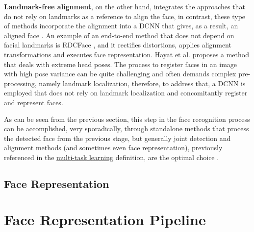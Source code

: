 \documentclass[class=report, crop=false, a4paper, 12pt]{standalone}
\begin{document}
\vspace{\baselineskip}
\par \noindent \textbf{Landmark-free alignment}, on the other hand, integrates the approaches that do not rely on landmarks as a reference to align the face, in contrast, these type of methods incorporate the alignment into a DCNN that gives, as a result, an aligned face \autocite{duElementsEndtoendDeep2022}. An example of an end-to-end method that does not depend on facial landmarks is RDCFace \autocite{zhaoRDCFaceRadialDistortion2020}, and it rectifies distortions, applies alignment transformations and executes face representation. Hayat et al. \autocite{hayatJointRegistrationRepresentation2017} proposes a method that deals with extreme head poses. The process to register faces in an image with high pose variance can be quite challenging and often demands complex pre-processing, namely landmark localization, therefore, to address that, a DCNN is employed that does not rely on landmark localization and concomitantly register and represent faces.


\vspace{\baselineskip}
\par As can be seen from the previous section, this step in the face recognition process can be accomplished, very sporadically, through standalone methods that process the detected face from the previous stage, but generally joint detection and alignment methods (and sometimes even face representation), previously referenced in the \hyperref[mt learning]{multi-task learning} definition, are the optimal choice \autocite{changFacePoseNetMakingCase2017}.

\subsection{Face Representation}

\newpage
\section{Face Representation Pipeline}
\end{document}
